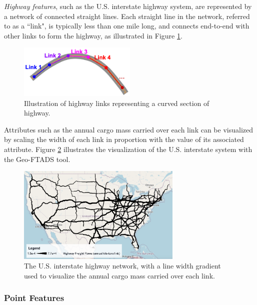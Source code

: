 \textit{Highway features}, such as the U.S. interstate highway system, are represented by a network of connected straight lines. Each straight line in the network, referred to as a ``link", is typically less than one mile long, and connects end-to-end with other links to form the highway, as illustrated in Figure \ref{fig:highway_links_visual}.

\begin{figure}[ht]
    \centering
    \includegraphics[width=0.5\textwidth]{figures/highway_links_visual.png}
    \caption{Illustration of highway links representing a curved section of highway.}
    \label{fig:highway_links_visual}
\end{figure}

Attributes such as the annual cargo mass carried over each link can be visualized by scaling the width of each link in proportion with the value of its associated attribute. Figure \ref{fig:highway_flows} illustrates the visualization of the U.S. interstate system with the Geo-FTADS tool. 

\begin{figure}[ht]
    \centering
    \includegraphics[width=0.7\textwidth]{figures/highway_flows.png}
    \caption{The U.S. interstate highway network, with a line width gradient used to visualize the annual cargo mass carried over each link.}
    \label{fig:highway_flows}
\end{figure}

\subsubsection{Point Features}

